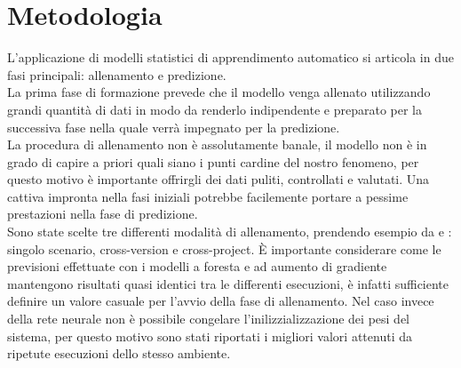 \documentclass[%
    corpo=12pt,
    twoside,
    oldstyle,
    autoretitolo,
    greek,
    evenboxes,
]{toptesi}
\begin{document}
\section{Metodologia}
L'applicazione di modelli statistici di apprendimento automatico si articola in due fasi principali: allenamento e predizione.\\
La prima fase di formazione prevede che il modello venga allenato utilizzando grandi quantità di dati in modo da renderlo indipendente e preparato per la successiva fase nella quale verrà impegnato per la predizione.\\
La procedura di allenamento non è assolutamente banale, il modello non è in grado di capire a priori quali siano i punti cardine del nostro fenomeno, per questo motivo è importante offrirgli dei dati puliti, controllati e valutati. Una cattiva impronta nella fasi iniziali potrebbe facilemente portare a pessime prestazioni nella fase di predizione.\\
Sono state scelte tre differenti modalità di allenamento, prendendo esempio da \cite{Chen} e \cite{super_unsuper}: singolo scenario, cross-version e cross-project. È importante considerare come le previsioni effettuate con i modelli a foresta e ad aumento di gradiente mantengono risultati quasi identici tra le differenti esecuzioni, è infatti sufficiente definire un valore casuale per l'avvio della fase di allenamento. Nel caso invece della rete neurale non è possibile congelare l'inilizzializzazione dei pesi del sistema, per questo motivo sono stati riportati i migliori valori attenuti da ripetute esecuzioni dello stesso ambiente.
\end{document}
